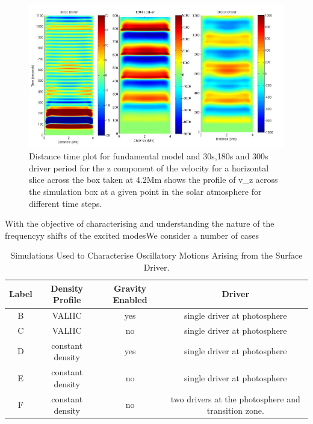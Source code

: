 \documentclass{aa}
\begin{document}

\begin{figure}[h]\label{fig7_dt_30_180_300_0_horiz_4p2Mm}
\includegraphics[scale=0.5]{images/fig7_dt_30_180_300_0_horiz_4p2Mm.jpg}
\caption{Distance time plot for fundamental model and 30s,180s and 300s driver period for the z component of the velocity for a horizontal slice across the box  taken at 4.2Mm shows  the profile of v_{z} across the simulation box at a given point in the solar atmosphere for different time steps. }
\end{figure}




















With the objective of characterising and understanding the nature of the frequencyy shifts of the excited modesWe consider a number of cases

\begin{table}
\centering
\begin{tabular}{c c c c }
\hline
Label   &  Density Profile & Gravity Enabled & Driver\\
\hline
B &  VALIIC & yes & single driver at photosphere & \\
\hline
C & VALIIC & no & single driver at photosphere &  \\
\hline
D & constant density & yes & single driver at photosphere &  \\
\hline
E & constant density & no & single driver at photosphere &  \\
\hline
F & constant density & no & two drivers at the photosphere and transition zone. &  \\
\hline
\end{tabular} 
\caption{Simulations Used to Characterise Oscillatory Motions Arising from the Surface Driver.}
\end{table}
\end{document}
